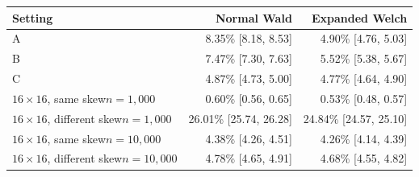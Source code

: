 \begin{tabularx}{\textwidth}{@{}>{\raggedright\arraybackslash}Xrr@{}}
\toprule
Setting & Normal Wald & Expanded Welch\\
\midrule
A & 8.35\% [8.18, 8.53] & 4.90\% [4.76, 5.03]\\
B & 7.47\% [7.30, 7.63] & 5.52\% [5.38, 5.67]\\
C & 4.87\% [4.73, 5.00] & 4.77\% [4.64, 4.90]\\
\(16\times16\), same skew\newline \(n=1{,}000\) & 0.60\% [0.56, 0.65] & 0.53\% [0.48, 0.57]\\
\(16\times16\), different skew\newline \(n=1{,}000\) & 26.01\% [25.74, 26.28] & 24.84\% [24.57, 25.10]\\
\midrule
\(16\times16\), same skew\newline \(n=10{,}000\) & 4.38\% [4.26, 4.51] & 4.26\% [4.14, 4.39]\\
\(16\times16\), different skew\newline \(n=10{,}000\) & 4.78\% [4.65, 4.91] & 4.68\% [4.55, 4.82]\\
\bottomrule
\end{tabularx}

